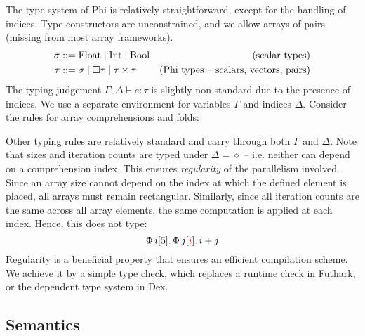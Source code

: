 The type system of Phi is relatively straightforward, except for the handling of indices. Type constructors are unconstrained, and we allow arrays of pairs (missing from most array frameworks).
\begin{align*}
\mathrm{\sigma} &::= \phifloattype \mid \phiinttype \mid \phibooltype & \text{(scalar types)} \\
\tau &::= \mathrm{\sigma} \mid \phivectype{\tau} \mid \phipairtype{\tau}{\tau} & \text{(Phi types -- scalars, vectors, pairs)}
\end{align*}
The typing judgement $\Gamma; \Delta \vdash e : \tau$ is slightly non-standard due to the presence of indices. We use a separate environment for variables $\Gamma$ and indices $\Delta$. Consider the rules for array comprehensions and folds:
\begin{center}
    \begin{prooftree}
    \end{prooftree} \quad
    \begin{prooftree}
    \end{prooftree}
\end{center}
Other typing rules are relatively standard and carry through both $\Gamma$ and $\Delta$. Note that sizes and iteration counts are typed under $\Delta = \diamond$ -- i.e. neither can depend on a comprehension index. This ensures \textit{regularity} of the parallelism involved. Since an array size cannot depend on the index at which the defined element is placed, all arrays must remain rectangular. Similarly, since all iteration counts are the same across all array elements, the same computation is applied at each index. Hence, this does not type:
$$ \phivec{i}{5}{\phivec{j}{\textcolor{red}{i}}{i + j}} $$
Regularity is a beneficial property that ensures an efficient compilation scheme. We achieve it by a simple type check, which replaces a runtime check in Futhark, or the dependent type system in Dex. 

\subsection{Semantics}

